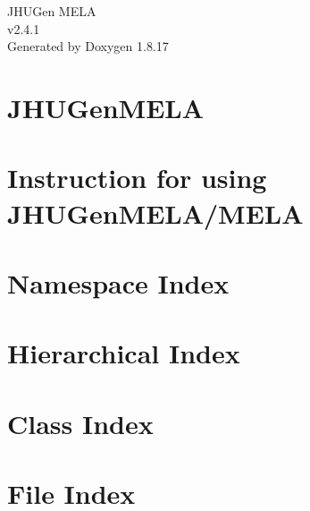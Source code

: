 \let\mypdfximage\pdfximage\def\pdfximage{\immediate\mypdfximage}\documentclass[twoside]{book}
\newcommand{\+}{\discretionary{\mbox{\scriptsize$\hookleftarrow$}}{}{}}
\newcommand{\clearemptydoublepage}{%
  \newpage{\pagestyle{empty}\cleardoublepage}%
}
\begin{document}
\hypersetup{pageanchor=false,
             bookmarksnumbered=true,
             pdfencoding=unicode
            }
\begin{titlepage}
\vspace*{7cm}
\begin{center}%
{\Large J\+H\+U\+Gen M\+E\+LA \\[1ex]\large v2.\+4.\+1 }\\
\vspace*{1cm}
{\large Generated by Doxygen 1.8.17}\\
\end{center}
\end{titlepage}
\clearemptydoublepage
{}
\tableofcontents
\clearemptydoublepage
{}
\hypersetup{pageanchor=true}

\chapter{J\+H\+U\+Gen\+M\+E\+LA}
\label{index}\hypertarget{index}{}
\chapter{Instruction for using J\+H\+U\+Gen\+M\+E\+L\+A/\+M\+E\+LA}
\label{md_MELA_README}

\chapter{Namespace Index}

\chapter{Hierarchical Index}

\chapter{Class Index}

\chapter{File Index}

\end{document}
